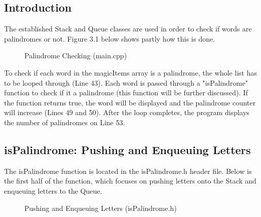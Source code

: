 \documentclass[letterpaper, 10pt]{article}
\begin{document}
\subsection{Introduction}
\noindent
The established Stack and Queue classes are used in order to check if words are palindromes or not. Figure 3.1 below shows partly how this is done.
\begin{figure}[H]
  \centering
  
  \caption{Palindrome Checking (main.cpp)}
  \label{fig:figure3.1}
\end{figure}
\noindent
To check if each word in the magicItems array is a palindrome, the whole list has to be looped through (Line 43). Each word is passed through a "isPalindrome" function to check if it a palindrome (this function will be further discussed). If the function returns true, the word will be displayed and the palindrome counter will increase (Lines 49 and 50). After the loop completes, the program displays the number of palindromes on Line 53. 

\subsection{isPalindrome: Pushing and Enqueuing Letters}
\noindent
The isPalindrome function is located in the isPalindrome.h header file. Below is the first half of the function, which focuses on pushing letters onto the Stack and enqueuing letters to the Queue.
\begin{figure}[H]
  \centering
  
  \label{fig:figure3.2-part1}
\end{figure}

\begin{figure}[H]
  \centering
  
  \caption{Pushing and Enqueuing Letters (isPalindrome.h)}
  \label{fig:figure3.2-part2}
\end{figure}
\end{document}
